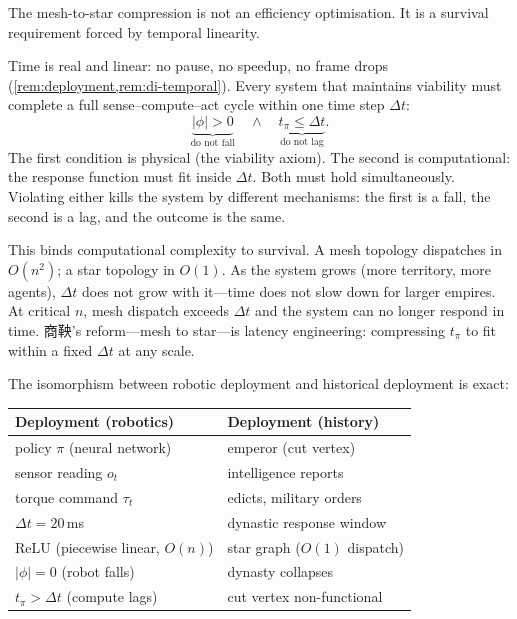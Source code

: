 \begin{remark}\label{rem:temporal}
The mesh-to-star compression is not an efficiency optimisation.  It is
a survival requirement forced by temporal linearity.

Time is real and linear: no pause, no speedup, no frame drops
(\cref{rem:deployment,rem:di-temporal}).  Every system that maintains
viability must complete a full sense--compute--act cycle within one
time step $\Delta t$:
\[
  \underbrace{|\phi| > 0}_{\text{do not fall}}
  \quad\wedge\quad
  \underbrace{t_{\pi} \leq \Delta t}_{\text{do not lag}}.
\]
The first condition is physical (the viability axiom).  The second is
computational: the response function must fit inside $\Delta t$.
Both must hold simultaneously.  Violating either kills the system
by different mechanisms: the first is a fall, the second is a lag,
and the outcome is the same.

This binds computational complexity to survival.  A mesh topology
dispatches in $O(n^2)$; a star topology in $O(1)$.  As the system
grows (more territory, more agents), $\Delta t$ does not grow with
it---time does not slow down for larger empires.  At critical $n$,
mesh dispatch exceeds $\Delta t$ and the system can no longer respond
in time.  商鞅's reform---mesh to star---is latency engineering:
compressing $t_\pi$ to fit within a fixed $\Delta t$ at any scale.

The isomorphism between robotic deployment and historical deployment
is exact:
\begin{center}
\renewcommand{\arraystretch}{1.25}
\begin{tabular}{@{}ll@{}}
\toprule
\textbf{Deployment (robotics)} & \textbf{Deployment (history)} \\
\midrule
policy $\pi$ (neural network) & emperor (cut vertex) \\
sensor reading $o_t$ & intelligence reports \\
torque command $\tau_t$ & edicts, military orders \\
$\Delta t = 20$\,ms & dynastic response window \\
ReLU (piecewise linear, $O(n)$) & star graph ($O(1)$ dispatch) \\
$|\phi| = 0$ (robot falls) & dynasty collapses \\
$t_\pi > \Delta t$ (compute lags) & cut vertex non-functional \\
\bottomrule
\end{tabular}
\end{center}


\end{remark}
